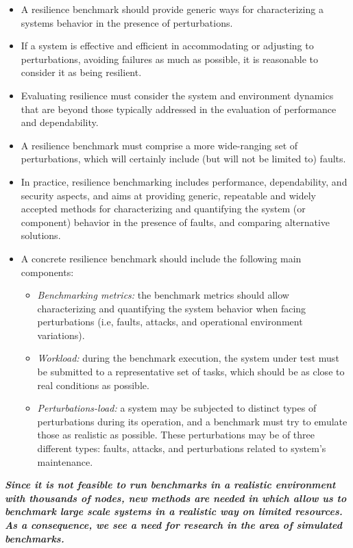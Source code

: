 \begin{itemize}
  \item A resilience benchmark should provide generic ways for characterizing a systems behavior in the presence of perturbations.
  \item If a system is effective and efficient in accommodating or adjusting to perturbations, avoiding failures as much as possible, it is reasonable to consider it as being resilient.
  \item Evaluating resilience must consider the system and environment dynamics that are beyond those typically addressed in the evaluation of performance and dependability.
  \item A resilience benchmark must comprise a more wide-ranging set of perturbations, which will certainly include (but will not be limited to) faults.
  \item In practice, resilience benchmarking includes performance, dependability, and security aspects, and aims at providing generic, repeatable and widely accepted methods for characterizing and quantifying the system (or component) behavior in the presence of faults, and comparing alternative solutions.
  \item A concrete resilience benchmark should include the following main components:
  \begin{itemize}
  \item \textit{Benchmarking metrics: } the benchmark metrics should allow characterizing and quantifying the system behavior when facing perturbations (i.e, faults, attacks, and operational environment variations).
  \item \textit{Workload: } during the benchmark execution, the system under test must be submitted to a representative set of tasks, which should be as close to real conditions as possible.
  \item \textit{Perturbations-load: } a system may be subjected to distinct types of perturbations during its operation, and a benchmark must try to emulate those as realistic as possible. These perturbations may be of three different types: faults, attacks, and perturbations related to system's maintenance.
\end{itemize}
\end{itemize}

\textit{\textbf{Since it is not feasible to run benchmarks in a realistic environment with thousands of nodes, new methods are needed in which allow us to benchmark large scale systems in a realistic way on limited resources. As a consequence, we see a need for research in the area of simulated benchmarks.}}



